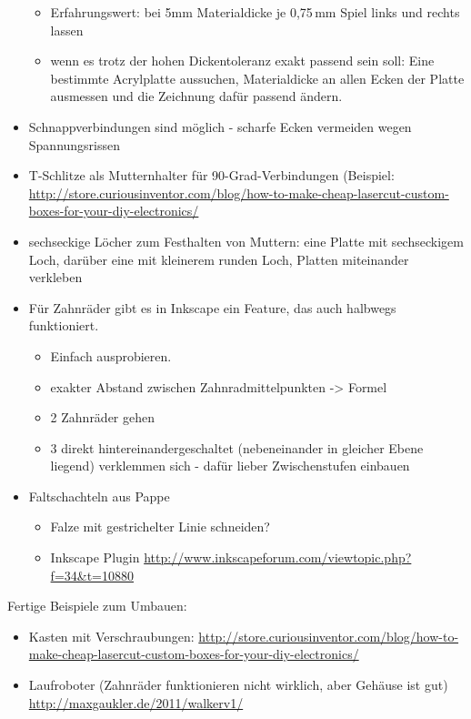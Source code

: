\documentclass{\basedir/fablab-document}
\begin{document}
\begin{itemize}
\begin{itemize}
		\item Erfahrungswert: bei 5mm Materialdicke je 0,75\,mm Spiel links und rechts lassen
		\item wenn es trotz der hohen Dickentoleranz exakt passend sein soll: Eine bestimmte
			Acrylplatte aussuchen, Materialdicke an allen Ecken der Platte ausmessen und die Zeichnung dafür passend ändern.
	\end{itemize}
  \item Schnappverbindungen sind möglich - scharfe Ecken vermeiden wegen Spannungsrissen
  \item T-Schlitze als Mutternhalter für 90-Grad-Verbindungen (Beispiel: \url{http://store.curiousinventor.com/blog/how-to-make-cheap-lasercut-custom-boxes-for-your-diy-electronics/}
  \item sechseckige Löcher zum Festhalten von Muttern: eine Platte mit sechseckigem Loch, darüber eine mit kleinerem runden Loch, Platten miteinander verkleben
  \item Für Zahnräder gibt es in Inkscape ein Feature, das auch halbwegs funktioniert.
	\begin{itemize}
      \item Einfach ausprobieren.
      \item exakter Abstand zwischen Zahnradmittelpunkten -> Formel %
      \item 2 Zahnräder gehen
      \item 3 direkt hintereinandergeschaltet (nebeneinander in gleicher Ebene liegend) verklemmen sich - dafür lieber Zwischenstufen einbauen
	\end{itemize}
  \item Faltschachteln aus Pappe
	\begin{itemize}
		\item Falze mit gestrichelter Linie schneiden?
		\item Inkscape Plugin \url{http://www.inkscapeforum.com/viewtopic.php?f=34&t=10880}
	\end{itemize}
\end{itemize}

Fertige Beispiele zum Umbauen:
\begin{itemize}
  \item Kasten mit Verschraubungen: \url{http://store.curiousinventor.com/blog/how-to-make-cheap-lasercut-custom-boxes-for-your-diy-electronics/}
  \item Laufroboter (Zahnräder funktionieren nicht wirklich, aber Gehäuse ist gut) \url{http://maxgaukler.de/2011/walkerv1/}
\end{itemize}
\end{document}
